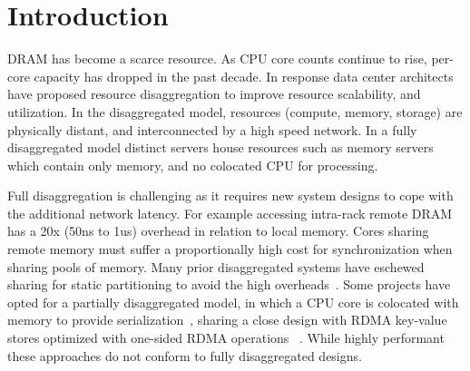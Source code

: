 \section{Introduction}
\label{sec:intro}


DRAM has become a scarce resource. As CPU core counts
continue to rise, per-core capacity has dropped in the past
decade. In response data center architects have proposed
resource disaggregation to improve resource scalability, and
utilization. In the disaggregated model, resources (compute,
memory, storage) are physically distant, and interconnected
by a high speed network. In a fully disaggregated model
distinct servers house resources such as memory servers
which contain only memory, and no colocated CPU for
processing.


Full disaggregation is challenging as it requires new system
designs to cope with the additional network latency.  For
example accessing intra-rack remote DRAM has a 20x (50ns to
1us) overhead in relation to local memory. Cores sharing
remote memory must suffer a proportionally high cost for
synchronization when sharing pools of memory. Many prior
disaggregated systems have eschewed sharing for static
partitioning to avoid the high overheads~\cite{legoos,
blade-server, reigons}.  Some projects have opted
for a partially disaggregated model, in which a CPU core is
colocated with memory to provide
serialization~\cite{clover}, sharing a close design with
RDMA key-value stores optimized with one-sided RDMA
operations ~\cite{herd,erpc,pilaf,cell,clover}. While highly
performant these approaches do not conform to fully
disaggregated designs.


